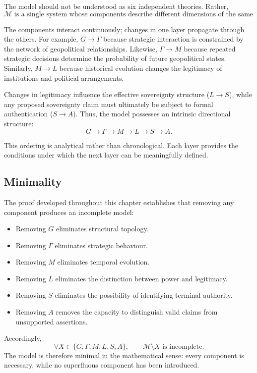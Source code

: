 \documentclass[11pt,openany]{book}
\theoremstyle{plain}
\theoremstyle{definition}
\begin{document}
The model should not be understood as six independent theories. Rather,
\[
\boxed{
\mathcal{M} \text{ is a single system whose components describe different dimensions of the same reality.}
}
\]

The components interact continuously; changes in one layer propagate through the others. For example, \(G \rightarrow \Gamma\) because strategic interaction is constrained by the network of geopolitical relationships. Likewise, \(\Gamma \rightarrow M\) because repeated strategic decisions determine the probability of future geopolitical states. Similarly, \(M \rightarrow L\) because historical evolution changes the legitimacy of institutions and political arrangements.

Changes in legitimacy influence the effective sovereignty structure (\(L \rightarrow S\)), while any proposed sovereignty claim must ultimately be subject to formal authentication (\(S \rightarrow A\)). Thus, the model possesses an intrinsic directional structure:
\[
\boxed{
G \rightarrow \Gamma \rightarrow M \rightarrow L \rightarrow S \rightarrow A.
}
\]

This ordering is analytical rather than chronological. Each layer provides the conditions under which the next layer can be meaningfully defined.

\subsection*{Minimality}

The proof developed throughout this chapter establishes that removing any component produces an incomplete model:
\begin{itemize}
    \item Removing \(G\) eliminates structural topology.
    \item Removing \(\Gamma\) eliminates strategic behaviour.
    \item Removing \(M\) eliminates temporal evolution.
    \item Removing \(L\) eliminates the distinction between power and legitimacy.
    \item Removing \(S\) eliminates the possibility of identifying terminal authority.
    \item Removing \(A\) removes the capacity to distinguish valid claims from unsupported assertions.
\end{itemize}

Accordingly,
\[
\boxed{
\forall X \in \{G,\Gamma,M,L,S,A\}, \qquad \mathcal{M}\setminus X \text{ is incomplete.}
}
\]
The model is therefore minimal in the mathematical sense: every component is necessary, while no superfluous component has been introduced.
\end{document}
